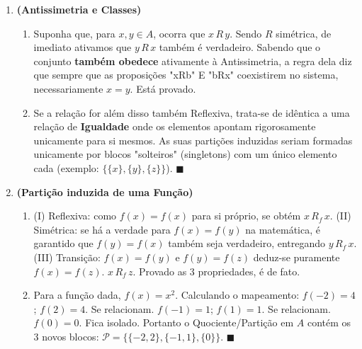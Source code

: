 \documentclass[12pt]{article}
\begin{document}
\begin{enumerate}
\vspace{0.3cm}
\item \textbf{(Antissimetria e Classes)}\\
\begin{enumerate}[label=\alph*)]
    \item Suponha que, para $x,y \in A$, ocorra que $x\,R\,y$. Sendo $R$ simétrica, de imediato ativamos que $y\,R\,x$ também é verdadeiro. Sabendo que o conjunto \textbf{também obedece } ativamente à Antissimetria, a regra dela diz que sempre que as proposições "xRb" E "bRx" coexistirem no sistema, necessariamente $x = y$. Está provado.
    \item Se a relação for além disso também Reflexiva, trata-se de idêntica a uma relação de \textbf{Igualdade} onde os elementos apontam rigorosamente unicamente para si mesmos. As suas partições induzidas seriam formadas unicamente por blocos "solteiros" (singletons) com um único elemento cada (exemplo: $\{ \{x\}, \{y\}, \{z\} \}$). $\blacksquare$
\end{enumerate}

\vspace{0.3cm}
\item \textbf{(Partição induzida de uma Função)}\\
\begin{enumerate}[label=\alph*)]
    \item (I) Reflexiva: como $f(x)=f(x)$ para si próprio, se obtém $x\,R_f\,x$. (II) Simétrica: se há a verdade para $f(x)=f(y)$ na matemática, é garantido que $f(y)=f(x)$ também seja verdadeiro, entregando $y\,R_f\,x$. (III) Transição: $f(x)=f(y)$ e $f(y)=f(z)$ deduz-se puramente $f(x)=f(z)$. $x\,R_f\,z$. Provado as 3 propriedades, é de fato.
    \item Para a função dada, $f(x) = x^2$. Calculando o mapeamento:
    $f(-2)=4$; $f(2)=4$. Se relacionam.
    $f(-1)=1$; $f(1)=1$. Se relacionam.
    $f(0)=0$. Fica isolado.
    Portanto o Quociente/Partição em $A$ contém os 3 novos blocos: $\mathcal{P} = \{ \{-2, 2\}, \{-1, 1\}, \{ 0 \} \}$. $\blacksquare$
\end{enumerate}


\end{enumerate}
\end{document}
